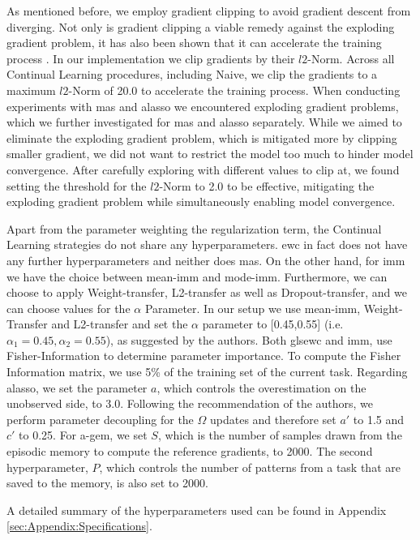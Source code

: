 As mentioned before, we employ gradient clipping to avoid gradient descent from diverging. Not only is gradient clipping a viable remedy against the exploding
gradient problem, it has also been shown that it can accelerate the training process \cite{zhang2019gradient}. In our implementation we clip gradients by their
$l2$-Norm. Across all Continual Learning procedures, including Naive, we clip the gradients to a maximum $l2$-Norm of 20.0 to accelerate the training process.
When conducting experiments with \gls{mas} and \gls{alasso} we encountered exploding gradient problems, which we further investigated for \gls{mas} and \gls{alasso}
separately. While we aimed to eliminate the exploding gradient problem, which is mitigated more by clipping smaller gradient, we did not want to restrict the
model too much to hinder model convergence. After carefully exploring with different values to clip at, we found setting the threshold for the $l2$-Norm to 2.0
to be effective, mitigating the exploding gradient problem while simultaneously enabling model convergence. \par
Apart from the parameter weighting the regularization term, the Continual Learning strategies do not share any hyperparameters. \gls{ewc} in fact does not have
any further hyperparameters and neither does \gls{mas}. On the other hand, for \gls{imm} we have the choice between mean-\gls{imm} and mode-\gls{imm}. Furthermore,
we can choose to apply Weight-transfer, L2-transfer as well as Dropout-transfer, and we can choose values for the $\alpha$ Parameter. In our setup we use mean-\gls{imm},
Weight-Transfer and L2-transfer and set the $\alpha$ parameter to [0.45,0.55] (i.e. $\alpha_1 = 0.45, \alpha_2 = 0.55$), as suggested by the authors. Both gls{ewc} and
\gls{imm}, use Fisher-Information to determine parameter importance. To compute the Fisher Information matrix, we use 5\% of the training set of the current task.
Regarding \gls{alasso}, we set the parameter $a$, which controls the overestimation on the unobserved side, to 3.0. Following the recommendation of the authors,
we perform parameter decoupling for the $\Omega$ updates and therefore set $a'$ to 1.5 and $c'$ to 0.25. For \gls{a-gem}, we set $S$, which is the number of samples
drawn from the episodic memory to compute the reference gradients, to 2000. The second hyperparameter, $P$, which controls the number of patterns from a task that
are saved to the memory, is also set to 2000. \par
A detailed summary of the hyperparameters used can be found in Appendix \ref{sec:Appendix:Specifications}.


